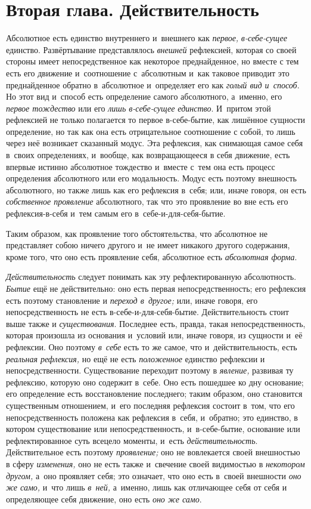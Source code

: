 \chapter[{\em Вторая глава} Действительность]{Вторая глава. Действительность}

Абсолютное есть единство внутреннего и~внешнего как {\em первое,}
{\em в-себе-сущее} единство. Развёртывание
представлялось {\em внешней} рефлексией, которая со
своей стороны имеет непосредственное как некоторое преднайденное, но вместе
с тем есть его движение и~соотношение с~абсолютным и~как таковое приводит
это преднайденное обратно в~абсолютное и~определяет его как
{\em голый вид и~способ}. Но этот вид и~способ есть
определение самого абсолютного, а~именно, его
{\em первое тождество} или его
{\em лишь в-себе-сущее единство}. И~притом этой
рефлексией не только полагается то первое в-себе-бытие, как лишённое
сущности определение, но так как она есть отрицательное соотношение с
собой, то лишь через неё возникает сказанный модус. Эта рефлексия, как
снимающая самое себя в~своих определениях, и~вообще, как возвращающееся в
себя движение, есть впервые истинно абсолютное тождество и~вместе с~тем она
есть процесс определения абсолютного или его модальность. Модус есть
поэтому внешность абсолютного, но также лишь как его рефлексия в~себя; или,
иначе говоря, он есть {\em собственное проявление}
абсолютного, так что это проявление во вне есть его рефлексия-в-себя и~тем
самым его в~себе-и-для-себя-бытие.

Таким образом, как проявление того обстоятельства, что абсолютное не
представляет собою ничего другого и~не имеет никакого другого содержания, кроме
того, что оно есть проявление себя, абсолютное есть {\em абсолютная форма}.

{\em Действительность} следует понимать как эту
рефлектированную абсолютность. {\em Бытие} ещё не
действительно: оно есть первая непосредственность; его рефлексия есть
поэтому становление и {\em переход в~другое;} или,
иначе говоря, его непосредственность не есть в-себе-и-для-себя-бытие.
Действительность стоит выше также и
{\em существования}. Последнее есть, правда, такая
непосредственность, которая произошла из основания и~условий или, иначе
говоря, из сущности и~её рефлексии. Оно поэтому
{\em в~себе} есть то же самое, что и~действительность,
есть {\em реальная рефлексия,} но ещё не есть
{\em положенное} единство рефлексии и
непосредственности. Существование переходит поэтому в
{\em явление,} развивая ту рефлексию, которую оно
содержит в~себе. Оно есть пошедшее ко дну основание; его определение есть
восстановление последнего; таким образом, оно становится существенным
отношением, и~его последняя рефлексия состоит в~том, что его
непосредственность положена как рефлексия в~себя, и~обратно; это единство,
в котором существование или непосредственность, и~в-себе-бытие, основание
или рефлектированное суть всецело моменты, и~есть
{\em действительность}. Действительное есть поэтому
{\em проявление;} оно не вовлекается своей внешностью в
сферу {\em изменения,} оно не есть также и~свечение
своей видимостью в {\em некотором другом,} а~оно
проявляет себя; это означает, что оно есть в~своей внешности
{\em оно же само,} и~что лишь
{\em в~ней,} а~именно, лишь как отличающее себя от себя
и определяющее себя движение, оно есть {\em оно же
само}.

